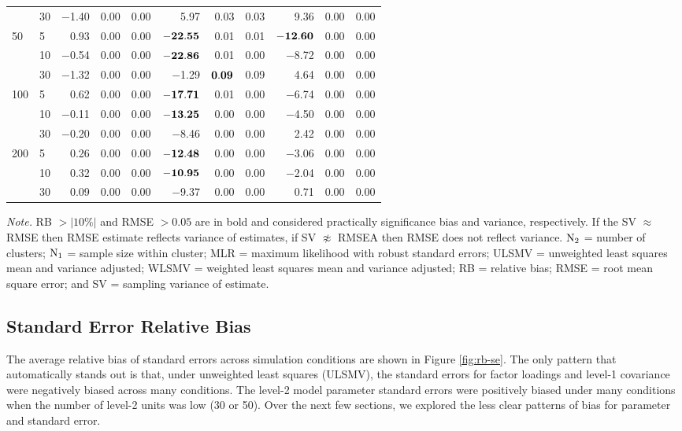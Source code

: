 \documentclass[Review,sageh,times, doublespace]{sagej}
\begin{document}
\begin{table}[!htp]
\begin{threeparttable}
\begin{tabular}{llrrrrrrrrr}
   & 30 & $-$1.40 & 0.00 & 0.00 & 5.97 & 0.03 & 0.03 & 9.36 & 0.00 & 0.00 \\ 
  50 & 5 & 0.93 & 0.00 & 0.00 & $\bf-22.55$ & 0.01 & 0.01 & $\bf-12.60$ & 0.00 & 0.00 \\ 
   & 10 & $-$0.54 & 0.00 & 0.00 & $\bf-22.86$ & 0.01 & 0.00 & $-$8.72 & 0.00 & 0.00 \\ 
   & 30 & $-$1.32 & 0.00 & 0.00 & $-$1.29 & $\bf0.09$ & 0.09 & 4.64 & 0.00 & 0.00 \\ 
  100 & 5 & 0.62 & 0.00 & 0.00 & $\bf-17.71$ & 0.01 & 0.00 & $-$6.74 & 0.00 & 0.00 \\ 
   & 10 & $-$0.11 & 0.00 & 0.00 & $\bf-13.25$ & 0.00 & 0.00 & $-$4.50 & 0.00 & 0.00 \\ 
   & 30 & $-$0.20 & 0.00 & 0.00 & $-$8.46 & 0.00 & 0.00 & 2.42 & 0.00 & 0.00 \\ 
  200 & 5 & 0.26 & 0.00 & 0.00 & $\bf-12.48$ & 0.00 & 0.00 & $-$3.06 & 0.00 & 0.00 \\ 
   & 10 & 0.32 & 0.00 & 0.00 & $\bf-10.95$ & 0.00 & 0.00 & $-$2.04 & 0.00 & 0.00 \\ 
   & 30 & 0.09 & 0.00 & 0.00 & $-$9.37 & 0.00 & 0.00 & 0.71 & 0.00 & 0.00 \\ 
   \bottomrule
\end{tabular}
 \vspace*{1mm}
 	\begin{tablenotes}
    {\small
        \textit{Note.} RB  $> |10\%|$ and RMSE $> 0.05$ are in bold and considered practically significance bias and variance, respectively. If the SV $\approx$ RMSE then RMSE estimate reflects variance of estimates, if SV $\not\approx$ RMSEA then RMSE does not reflect variance. $\rm N_{2}$ = number of clusters; $\rm N_1$ = sample size within cluster; MLR = maximum likelihood with robust standard errors; ULSMV = unweighted least squares mean and variance adjusted; WLSMV = weighted least squares mean and variance adjusted; RB = relative bias; RMSE = root mean square error; and SV = sampling variance of estimate.
    }
 	\end{tablenotes}
 \end{threeparttable}
\end{table}


\subsection{Standard Error Relative Bias}

The average relative bias of standard errors across simulation conditions are shown in Figure \ref{fig:rb-se}.
The only pattern that automatically stands out is that, under unweighted least squares (ULSMV), the standard errors for factor loadings and level-1 covariance were negatively biased across many conditions.
The level-2 model parameter standard errors were positively biased under many conditions when the number of level-2 units was low (30 or 50).
Over the next few sections, we explored the less clear patterns of bias for parameter and standard error.
\end{document}
